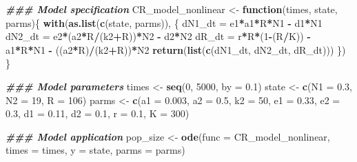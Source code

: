 \documentclass[
]{book}
\newenvironment{Shaded}{\begin{snugshade}}{\end{snugshade}}
\newcommand{\AttributeTok}[1]{\textcolor[rgb]{0.13,0.29,0.53}{#1}}
\newcommand{\ControlFlowTok}[1]{\textcolor[rgb]{0.13,0.29,0.53}{\textbf{#1}}}
\newcommand{\DecValTok}[1]{\textcolor[rgb]{0.00,0.00,0.81}{#1}}
\newcommand{\DocumentationTok}[1]{\textcolor[rgb]{0.56,0.35,0.01}{\textbf{\textit{#1}}}}
\newcommand{\FloatTok}[1]{\textcolor[rgb]{0.00,0.00,0.81}{#1}}
\newcommand{\FunctionTok}[1]{\textcolor[rgb]{0.13,0.29,0.53}{\textbf{#1}}}
\newcommand{\NormalTok}[1]{#1}
\newcommand{\OtherTok}[1]{\textcolor[rgb]{0.56,0.35,0.01}{#1}}
\newcommand{\SpecialCharTok}[1]{\textcolor[rgb]{0.81,0.36,0.00}{\textbf{#1}}}
\begin{document}
\begin{Shaded}
\begin{Highlighting}[]
\DocumentationTok{\#\#\# Model specification}
\NormalTok{CR\_model\_nonlinear }\OtherTok{\textless{}{-}} \ControlFlowTok{function}\NormalTok{(times, state, parms)\{}
  \FunctionTok{with}\NormalTok{(}\FunctionTok{as.list}\NormalTok{(}\FunctionTok{c}\NormalTok{(state, parms)), \{}
\NormalTok{         dN1\_dt }\OtherTok{=}\NormalTok{ e1}\SpecialCharTok{*}\NormalTok{a1}\SpecialCharTok{*}\NormalTok{R}\SpecialCharTok{*}\NormalTok{N1 }\SpecialCharTok{{-}}\NormalTok{ d1}\SpecialCharTok{*}\NormalTok{N1}
\NormalTok{         dN2\_dt }\OtherTok{=}\NormalTok{ e2}\SpecialCharTok{*}\NormalTok{(a2}\SpecialCharTok{*}\NormalTok{R}\SpecialCharTok{/}\NormalTok{(k2}\SpecialCharTok{+}\NormalTok{R))}\SpecialCharTok{*}\NormalTok{N2 }\SpecialCharTok{{-}}\NormalTok{ d2}\SpecialCharTok{*}\NormalTok{N2}
\NormalTok{         dR\_dt }\OtherTok{=}\NormalTok{  r}\SpecialCharTok{*}\NormalTok{R}\SpecialCharTok{*}\NormalTok{(}\DecValTok{1}\SpecialCharTok{{-}}\NormalTok{(R}\SpecialCharTok{/}\NormalTok{K)) }\SpecialCharTok{{-}}\NormalTok{ a1}\SpecialCharTok{*}\NormalTok{R}\SpecialCharTok{*}\NormalTok{N1 }\SpecialCharTok{{-}}\NormalTok{ ((a2}\SpecialCharTok{*}\NormalTok{R)}\SpecialCharTok{/}\NormalTok{(k2}\SpecialCharTok{+}\NormalTok{R))}\SpecialCharTok{*}\NormalTok{N2}
         \FunctionTok{return}\NormalTok{(}\FunctionTok{list}\NormalTok{(}\FunctionTok{c}\NormalTok{(dN1\_dt, dN2\_dt, dR\_dt)))}
\NormalTok{       \})}
\NormalTok{\}}

\DocumentationTok{\#\#\# Model parameters}
\NormalTok{times }\OtherTok{\textless{}{-}} \FunctionTok{seq}\NormalTok{(}\DecValTok{0}\NormalTok{, }\DecValTok{5000}\NormalTok{, }\AttributeTok{by =} \FloatTok{0.1}\NormalTok{)  }
\NormalTok{state }\OtherTok{\textless{}{-}} \FunctionTok{c}\NormalTok{(}\AttributeTok{N1 =} \FloatTok{0.3}\NormalTok{, }\AttributeTok{N2 =} \DecValTok{19}\NormalTok{, }\AttributeTok{R =} \DecValTok{106}\NormalTok{) }
\NormalTok{parms }\OtherTok{\textless{}{-}} \FunctionTok{c}\NormalTok{(}\AttributeTok{a1 =} \FloatTok{0.003}\NormalTok{, }\AttributeTok{a2 =} \FloatTok{0.5}\NormalTok{, }\AttributeTok{k2 =} \DecValTok{50}\NormalTok{, }\AttributeTok{e1 =} \FloatTok{0.33}\NormalTok{, }\AttributeTok{e2 =} \FloatTok{0.3}\NormalTok{, }\AttributeTok{d1 =} \FloatTok{0.11}\NormalTok{, }\AttributeTok{d2 =} \FloatTok{0.1}\NormalTok{, }\AttributeTok{r =} \FloatTok{0.1}\NormalTok{, }\AttributeTok{K =} \DecValTok{300}\NormalTok{)}

\DocumentationTok{\#\#\# Model application}
\NormalTok{pop\_size }\OtherTok{\textless{}{-}} \FunctionTok{ode}\NormalTok{(}\AttributeTok{func =}\NormalTok{ CR\_model\_nonlinear, }\AttributeTok{times =}\NormalTok{ times, }\AttributeTok{y =}\NormalTok{ state, }\AttributeTok{parms =}\NormalTok{ parms)}


\end{Highlighting}
\end{Shaded}
\end{document}
